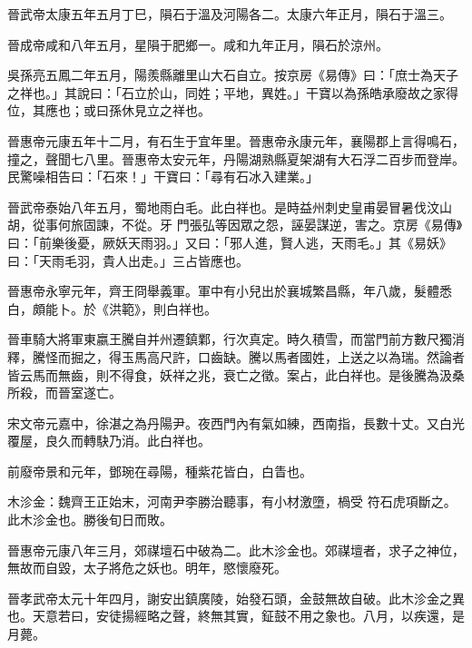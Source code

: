 \begin{pinyinscope}
 晉武帝太康五年五月丁巳，隕石于溫及河陽各二。太康六年正月，隕石于溫三。



 晉成帝咸和八年五月，星隕于肥鄉一。咸和九年正月，隕石於涼州。



 吳孫亮五鳳二年五月，陽羨縣離里山大石自立。按京房《易傳》曰：「庶士為天子之祥也。」其說曰：「石立於山，同姓；平地，異姓。」干寶以為孫皓承廢故之家得位，其應也；或曰孫休見立之祥也。



 晉惠帝元康五年十二月，有石生于宜年里。晉惠帝永康元年，襄陽郡上言得鳴石，撞之，聲聞七八里。晉惠帝太安元年，丹陽湖熟縣夏架湖有大石浮二百步而登岸。民驚噪相告曰：「石來！」干寶曰：「尋有石冰入建業。」



 晉武帝泰始八年五月，蜀地雨白毛。此白祥也。是時益州刺史皇甫晏冒暑伐汶山胡，從事何旅固諫，不從。牙
 門張弘等因眾之怨，誣晏謀逆，害之。京房《易傳》曰：「前樂後憂，厥妖天雨羽。」又曰：「邪人進，賢人逃，天雨毛。」其《易妖》曰：「天雨毛羽，貴人出走。」三占皆應也。



 晉惠帝永寧元年，齊王冏舉義軍。軍中有小兒出於襄城繁昌縣，年八歲，髮體悉白，頗能卜。於《洪範》，則白祥也。



 晉車騎大將軍東嬴王騰自并州遷鎮鄴，行次真定。時久積雪，而當門前方數尺獨消釋，騰怪而掘之，得玉馬高尺許，口齒缺。騰以馬者國姓，上送之以為瑞。然論者
 皆云馬而無齒，則不得食，妖祥之兆，衰亡之徵。案占，此白祥也。是後騰為汲桑所殺，而晉室遂亡。



 宋文帝元嘉中，徐湛之為丹陽尹。夜西門內有氣如練，西南指，長數十丈。又白光覆屋，良久而轉駃乃消。此白祥也。



 前廢帝景和元年，鄧琬在尋陽，種紫花皆白，白眚也。



 木沴金：魏齊王正始末，河南尹李勝治聽事，有小材激墮，楇受
 符石虎項斷之。此木沴金也。勝後旬日而敗。



 晉惠帝元康八年三月，郊禖壇石中破為二。此木沴金也。郊禖壇者，求子之神位，無故而自毀，太子將危之妖也。明年，愍懷廢死。



 晉孝武帝太元十年四月，謝安出鎮廣陵，始發石頭，金鼓無故自破。此木沴金之異也。天意若曰，安徒揚經略之聲，終無其實，鉦鼓不用之象也。八月，以疾還，是月薨。



\end{pinyinscope}